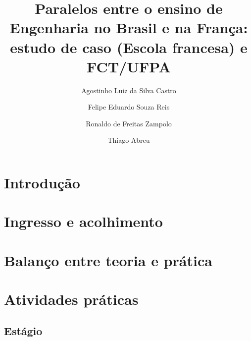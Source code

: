 

\title{Paralelos entre o ensino de Engenharia no Brasil e na França: estudo de caso (Escola francesa) e  FCT/UFPA}

\author[1]{Agostinho Luiz da Silva Castro}
\author[1]{Felipe Eduardo Souza Reis}
\author[1]{Ronaldo de Freitas Zampolo}
\author[2]{Thiago Abreu}



\maketitle

\begin{abstract}

\end{abstract}

\section{Introdução}
\label{sec:intro}


\section{Ingresso e acolhimento}
\label{sec:ingr}


\section{Balanço entre teoria e prática}
\label{sec:teopratica}


\section{Atividades práticas}
\label{sec:atvprt}
\subsection{Estágio}
\label{ssec:estagio}


